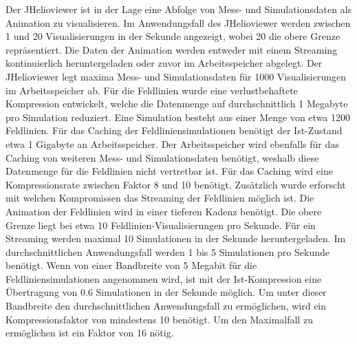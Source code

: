 Der JHelioviewer ist in der Lage eine Abfolge von Mess- und Simulationsdaten als Animation zu visualisieren. Im Anwendungsfall des JHelioviewer werden zwischen 1 und 20 Visualisierungen in der Sekunde angezeigt, wobei 20 die obere Grenze repräsentiert. Die Daten der Animation werden entweder mit einem Streaming kontinuierlich heruntergeladen oder zuvor im Arbeitsspeicher abgelegt. Der JHelioviewer legt maxima Mess- und Simulationsdaten für 1000 Visualisierungen im Arbeitsspeicher ab. Für die Feldlinien wurde eine verlustbehaftete Kompression entwickelt, welche die Datenmenge auf durchschnittlich 1 Megabyte pro Simulation reduziert. Eine Simulation besteht aus einer Menge von etwa 1200 Feldlinien. Für das Caching der Feldliniensimulationen benötigt der Ist-Zustand etwa 1 Gigabyte an Arbeitsspeicher. Der Arbeitsspeicher wird ebenfalls für das Caching von weiteren Mess- und Simulationsdaten benötigt, weshalb diese Datenmenge für die Feldlinien nicht vertretbar ist. Für das Caching wird eine Kompressionsrate zwischen Faktor 8 und 10 benötigt. Zusätzlich wurde erforscht mit welchen Kompromissen das Streaming der Feldlinien möglich ist. Die Animation der Feldlinien wird in einer tieferen Kadenz benötigt. Die obere Grenze liegt bei etwa 10 Feldlinien-Visualisierungen pro Sekunde. Für ein Streaming werden maximal 10 Simulationen in der Sekunde heruntergeladen. Im durchschnittlichen Anwendungsfall werden 1 bis 5 Simulationen pro Sekunde benötigt. Wenn von einer Bandbreite von 5 Megabit für die Feldliniensimulationen angenommen wird, ist mit der Ist-Kompression eine Übertragung von 0.6 Simulationen in der Sekunde möglich. Um unter dieser Bandbreite den durchschnittlichen Anwendungsfall zu ermöglichen, wird ein Kompressionsfaktor von mindestens 10 benötigt. Um den Maximalfall zu ermöglichen ist ein Faktor von 16 nötig.

